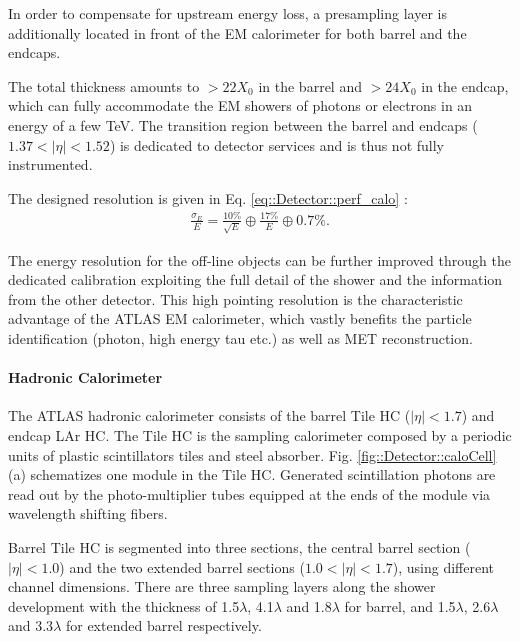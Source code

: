 In order to compensate for upstream energy loss, a presampling layer is additionally located in front of the EM calorimeter for both barrel and the endcaps.

The total thickness amounts to $>22X_0$ in the barrel and  $>24X_0$ in the endcap, which can fully accommodate the EM showers of photons or electrons in an energy of a few TeV.
The transition region between the barrel and endcaps ($1.37 < |\eta| <1.52$) is dedicated to detector services and is thus not fully instrumented.



The designed resolution is given in Eq. \ref{eq::Detector::perf_calo} \cite{ATLAS_LAr_TDR}:
\begin{align}
\frac{\sigma_E}{E} = \frac{10\%}{\sqrt{E}} \oplus \frac{17\%}{E} \oplus 0.7\%.
\label{eq::Detector::perf_calo}
\end{align}

The energy resolution for the off-line objects can be further improved through the dedicated calibration exploiting the full detail of the shower and the information from the other detector. 
This high pointing resolution is the characteristic advantage of the ATLAS EM calorimeter, which vastly benefits the particle identification (photon, high energy tau etc.) as well as MET reconstruction.



\paragraph{Hadronic Calorimeter}
The ATLAS hadronic calorimeter consists of the barrel Tile HC ($|\eta|<1.7$) and endcap LAr HC.
The Tile HC is the sampling calorimeter composed by a periodic units of plastic scintillators tiles and steel absorber.
Fig. \ref{fig::Detector::caloCell} (a) schematizes one module in the Tile HC. Generated scintillation photons are read out by the photo-multiplier tubes equipped at the ends of the module via wavelength shifting fibers. 

Barrel Tile HC is segmented into three sections, the central barrel section ($|\eta|<1.0$) and the two extended barrel sections ($1.0<|\eta|<1.7$), using different channel dimensions. There are three sampling layers along the shower development with the thickness of 1.5$\lambda$, 4.1$\lambda$ and 1.8$\lambda$ for barrel, and 1.5$\lambda$, 2.6$\lambda$ and 3.3$\lambda$ for extended barrel respectively. \\

